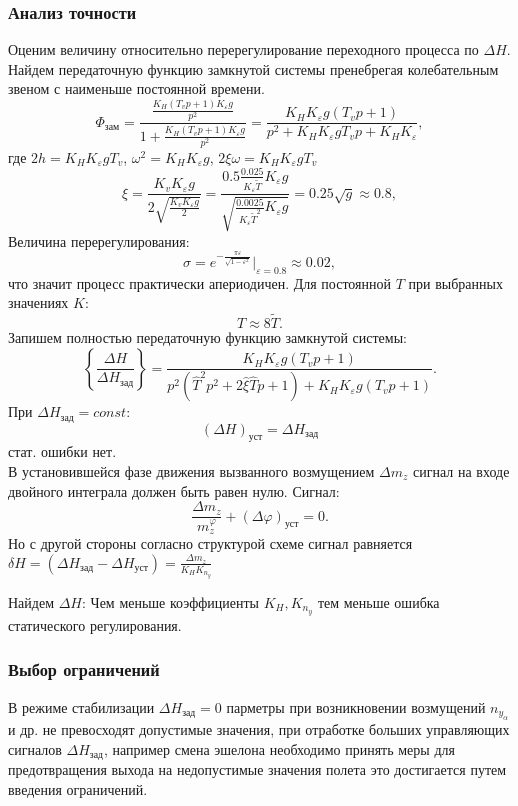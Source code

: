 \documentclass{article}
\begin{document}
\subsubsection{Анализ точности}
Оценим величину относительно перерегулирование переходного процесса по $\Delta H$. Найдем передаточную функцию замкнутой системы пренебрегая колебательным звеном с наименьше постоянной времени.
\[
    \Phi_{зам} = \frac{\frac{K_H(T_v p + 1) K_\varepsilon g}{p^2}}{1 + \frac{K_H(T_v p + 1) K_\varepsilon g}{p^2}} = \frac{K_H K_\varepsilon g(T_v p + 1)}{ p^2 +  K_H K_\varepsilon g T_v p +  K_H K_\varepsilon}
,\]
где $2h = K_H K_\varepsilon g T_v$, $\omega^2 = K_H K_\varepsilon g$, $2 \xi \omega = K_H K_\varepsilon g T_v$
\[
    \xi = \frac{K_v K_\varepsilon g}{2 \sqrt{\frac{K_v K_\varepsilon g}{2}}} = \frac{0.5 \frac{0.025}{K_\varepsilon \tilde{T}} K_\varepsilon g}{\sqrt{\frac{0.0025}{K_\varepsilon \tilde{T}^2} K_\varepsilon  g}} = 0.25 \sqrt{g} \approx 0.8,
\]
Величина перерегулирования:
\[
    \sigma = e^{- \frac{\pi \varepsilon}{\sqrt{1 - \varepsilon^2}}} |_{\varepsilon = 0.8} \approx 0.02,
\]
что значит процесс практически апериодичен. Для постоянной $T$ при выбранных значениях $K$:
\[
    T \approx 8 \tilde{T}
.\]
Запишем полностью передаточную функцию замкнутой системы:
\[
    \left\{ \frac{\Delta H }{\Delta H_{зад}} \right\}  = \frac{K_H K_\varepsilon g (T_v p + 1)}{p^2 (\hat{T}^2 p^2 + 2 \hat{\xi} \hat{T}p + 1) + K_H K_\varepsilon g (T_v p +1)}.
\]
При $\Delta H_{зад} = const$:
\[
    (\Delta H)_{уст} = \Delta H_{зад}
\]
стат. ошибки нет.\\
В установившейся фазе движения вызванного возмущением $ \Delta m_z $ сигнал на входе двойного интеграла должен быть равен нулю.
Сигнал:
\[
    \frac{\Delta m_z}{m_z^\varphi} + (\Delta \varphi)_{уст} = 0   
.\]
Но с другой стороны согласно структурой схеме сигнал равняется $\delta H = (\Delta H_{зад} - \Delta H_{уст}) = \frac{\Delta m_z}{K_H K_{n_y}}$

Найдем $\Delta H$:
Чем меньше коэффициенты $K_H, K_{n_y}$ тем меньше ошибка статического регулирования.

\subsubsection{Выбор ограничений}
В режиме стабилизации $\Delta H_{зад} = 0$ парметры при возникновении возмущений $n_{y_\alpha}$ и др. не превосходят допустимые значения, при отработке больших управляющих сигналов $\Delta H_{зад}$, например смена эшелона необходимо принять меры для предотвращения выхода на недопустимые значения полета это достигается путем введения ограничений.    
\end{document}
